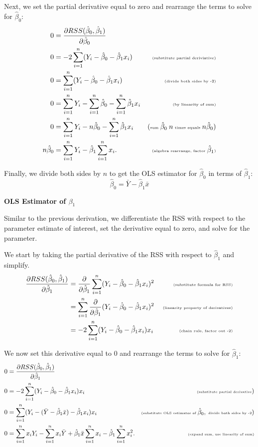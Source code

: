 \documentclass[
]{book}
\theoremstyle{definition}
\theoremstyle{definition}
\theoremstyle{definition}
\theoremstyle{definition}
\theoremstyle{remark}
\begin{document}
Next, we set the partial derivative equal to zero and rearrange the terms to solve for \(\hat{\beta}_0\):
\[
\begin{aligned}
0 &= \frac{\partial RSS(\hat\beta_0, \hat\beta_1)}{\partial \hat\beta_0}  &  \\
0 &= -2\sum_{i=1}^n(Y_i - \hat\beta_0 - \hat\beta_1x_i) & \tiny\text{ (substitute partial deriviative)}\\
0 &= \sum_{i=1}^n(Y_i - \hat\beta_0 - \hat\beta_1x_i) & \tiny\text{ (divide both sides by -2)} \\
0 &= \sum_{i=1}^n Y_i - \sum_{i=1}^n\hat\beta_0 - \sum_{i=1}^n\hat\beta_1x_i &\tiny\text{ (by linearity of sum)} \\
0 &= \sum_{i=1}^n Y_i - n\hat\beta_0 - \sum_{i=1}^n\hat\beta_1x_i & \tiny(\text{sum }\hat\beta_0\ n\text{ times equals }n\hat\beta_0) \\
n\hat\beta_0 &= \sum_{i=1}^n Y_i-\hat{\beta}_1\sum_{i=1}^nx_i. &\tiny\text{ (algebra rearrange, factor }\hat{\beta}_1\text{)} \\
\end{aligned}
\]

Finally, we divide both sides by \(n\) to get the OLS estimator for \(\hat\beta_0\) in terms of \(\hat\beta_1\):
\[
\hat\beta_0 = \bar Y-\hat\beta_1\bar x
\]

\textbf{OLS Estimator of \(\beta_1\)}

Similar to the previous derivation, we differentiate the RSS with respect to the parameter estimate of interest, set the derivative equal to zero, and solve for the parameter.

We start by taking the partial derivative of the RSS with respect to \(\hat{\beta}_1\) and simplify.
\[
\begin{aligned}
\frac{\partial RSS(\hat\beta_0, \hat\beta_1)}{\partial \hat\beta_1} &= \frac{\partial}{\partial \hat\beta_1}\sum_{i=1}^n (Y_i - \hat\beta_0 - \hat\beta_1x_i)^2 & \tiny\text{ (substitute formula for RSS)} \\
&= \sum_{i=1}^n \frac{\partial}{\partial \hat\beta_1}(Y_i - \hat\beta_0 - \hat\beta_1x_i)^2 & \tiny\text{ (linearity property of derivatives)} \\
&= -2\sum_{i=1}^n(Y_i-\hat\beta_0-\hat\beta_1x_i)x_i & \tiny\text{ (chain rule, factor out -2)}
\end{aligned}
\]

We now set this derivative equal to 0 and rearrange the terms to solve for \(\hat{\beta}_1\):
\[
\begin{aligned}
0 &= \frac{\partial RSS(\hat\beta_0, \hat\beta_1)}{\partial \hat\beta_1} & \\
0 &= -2\sum_{i=1}^n(Y_i-\hat\beta_0-\hat\beta_1x_i)x_i &\tiny\text{(substitute partial derivative})\\
0 &= \sum_{i=1}^n(Y_i-(\bar Y -\hat \beta_1\bar x)-\hat\beta_1x_i)x_i &\tiny\text{(substitute OLS estimator of }\hat\beta_0, \text{ divide both sides by -2}) \\
0 &= \sum_{i=1}^n x_iY_i -\sum_{i=1}^n x_i\bar Y+\hat\beta_1\bar x\sum_{i=1}^n x_i-\hat\beta_1\sum_{i=1}^n x_i^2. &\tiny\text{(expand sum, use linearity of sum)} \\
\end{aligned}
\]
\end{document}
